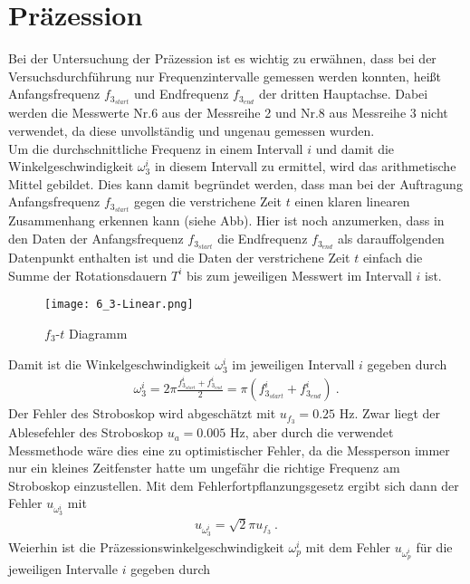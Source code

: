 

\section{Präzession}

Bei der Untersuchung der Präzession ist es wichtig zu erwähnen, dass bei der Versuchsdurchführung nur Frequenzintervalle gemessen werden konnten, heißt Anfangsfrequenz $f_{3_{start}}$ und Endfrequenz $f_{3_{end}}$ der dritten Hauptachse. Dabei werden die Messwerte Nr.6 aus der Messreihe 2 und Nr.8 aus Messreihe 3 nicht verwendet, da diese unvollständig und ungenau gemessen wurden. \\
Um die durchschnittliche Frequenz in einem Intervall $i$ und damit die Winkelgeschwindigkeit $\omega_3^i$ in diesem Intervall zu ermittel, wird das arithmetische Mittel gebildet. Dies kann damit begründet werden, dass man bei der Auftragung Anfangsfrequenz $f_{3_{start}}$ gegen die verstrichene Zeit $t$ einen klaren linearen Zusammenhang erkennen kann (siehe Abb). Hier ist noch anzumerken, dass in den Daten der Anfangsfrequenz $f_{3_{start}}$ die Endfrequenz $f_{3_{end}}$ als darauffolgenden Datenpunkt enthalten ist und die Daten der verstrichene Zeit $t$ einfach die Summe der Rotationsdauern $T^i$ bis zum jeweiligen Messwert im Intervall $i$ ist.
\begin{figure}[ht]
    \centering
    \caption{$f_3$-$t$ Diagramm}
    \texttt{[image: 6\_3-Linear.png]}
\end{figure}
Damit ist die Winkelgeschwindigkeit $\omega_3^i$ im jeweiligen Intervall $i$ gegeben durch 
\begin{align}
    \omega_3^i=2\pi\frac{f_{3_{start}}^i+f_{3_{end}}^i}{2}=\pi(f_{3_{start}}^i+f_{3_{end}}^i)~.
\end{align}
Der Fehler des Stroboskop wird abgeschätzt mit $u_{f_3} = 0.25$ Hz. Zwar liegt der Ablesefehler des Stroboskop $u_a = 0.005$ Hz, aber durch die verwendet Messmethode wäre dies eine zu optimistischer Fehler, da die Messperson immer nur ein kleines Zeitfenster hatte um ungefähr die richtige Frequenz am Stroboskop einzustellen. Mit dem Fehlerfortpflanzungsgesetz ergibt sich dann der Fehler $u_{\omega_3^i}$ mit
\begin{align}
    u_{\omega_3^i}=\sqrt{2}\pi u_{f_3}~.
\end{align}
Weierhin ist die Präzessionswinkelgeschwindigkeit $\omega_p^i$ mit dem Fehler $u_{\omega_p^i}$ für die jeweiligen Intervalle $i$ gegeben durch 
